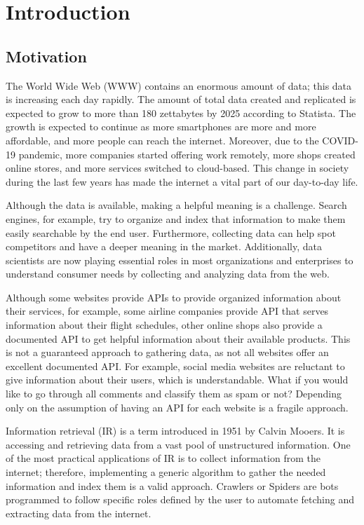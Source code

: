\chapter{Introduction}
\label{chap:introduction}
\section{Motivation}

The World Wide Web (WWW) contains an enormous amount of data; this data is increasing each day rapidly. The amount of total data created and replicated is expected to grow to more than 180 zettabytes by 2025 according to Statista. The growth is expected to continue as more smartphones are more and more affordable, and more people can reach the internet. Moreover, due to the COVID-19 pandemic, more companies started offering work remotely, more shops created online stores, and more services switched to cloud-based. This change in society during the last few years has made the internet a vital part of our day-to-day life.   

Although the data is available, making a helpful meaning is a challenge. Search engines, for example, try to organize and index that information to make them easily searchable by the end user. Furthermore, collecting data can help spot competitors and have a deeper meaning in the market. Additionally, data scientists are now playing essential roles in most organizations and enterprises to understand consumer needs by collecting and analyzing data from the web.  


Although some websites provide APIs to provide organized information about their services, for example, some airline companies provide API that serves information about their flight schedules, other online shops also provide a documented API to get helpful information about their available products. This is not a guaranteed approach to gathering data, as not all websites offer an excellent documented API. For example, social media websites are reluctant to give information about their users, which is understandable. What if you would like to go through all comments and classify them as spam or not? Depending only on the assumption of having an API for each website is a fragile approach. 

Information retrieval (IR) is a term introduced in 1951 by Calvin
Mooers. It is accessing and retrieving data from a vast pool of unstructured information. One of the most practical applications of IR is to collect information from the internet; therefore, implementing a generic algorithm to gather the needed information and index them is a valid approach. Crawlers or Spiders are bots programmed to follow specific roles defined by the user to automate fetching and extracting data from the internet.  

